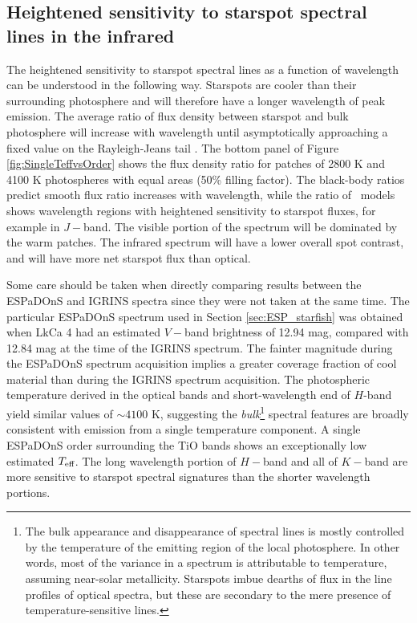 \documentclass[twocolumn]{emulateapj}%
\begin{document}
\subsection{Heightened sensitivity to starspot spectral lines in the infrared}\label{sec:whyNearIR}

The heightened sensitivity to starspot spectral lines as a function of wavelength can be understood in the following way.  Starspots are cooler than their surrounding photosphere and will therefore have a longer wavelength of peak emission.  The average ratio of flux density between starspot and bulk photosphere will increase with wavelength until asymptotically approaching a fixed value on the Rayleigh-Jeans tail \citep{wolk96}.  The bottom panel of Figure \ref{fig:SingleTeffvsOrder} shows the flux density ratio for patches of 2800 K and 4100 K photospheres with equal areas (50\% filling factor).  The black-body ratios predict smooth flux ratio increases with wavelength, while the ratio of \PHOENIX\ models shows wavelength regions with heightened sensitivity to starspot fluxes, for example in $J-$band.  The visible portion of the spectrum will be dominated by the warm patches.  The infrared spectrum will have a lower overall spot contrast, and will have more net starspot flux than optical.

Some care should be taken when directly comparing results between the ESPaDOnS and IGRINS spectra since they were not taken at the same time.  The particular ESPaDOnS spectrum used in Section \ref{sec:ESP_starfish} was obtained when LkCa 4 had an estimated $V-$band brightness of 12.94 mag, compared with 12.84 mag at the time of the IGRINS spectrum.  The fainter magnitude during the ESPaDOnS spectrum acquisition implies a greater coverage fraction of cool material than during the IGRINS spectrum acquisition.  
The photospheric temperature derived in the optical bands and short-wavelength end of $H$-band yield similar values of $\sim 4100$ K, suggesting the \emph{bulk}\footnote{The bulk appearance and disappearance of spectral lines is mostly controlled by the temperature of the emitting region of the local photosphere.  In other words, most of the variance in a spectrum is attributable to temperature, assuming near-solar metallicity. 
Starspots imbue dearths of flux in the line profiles of optical spectra, but these are secondary to the mere presence of temperature-sensitive lines.} spectral features are broadly consistent with emission from a single temperature component. A single ESPaDOnS order surrounding the TiO bands shows an exceptionally low estimated $T_\textrm{eff}$.  The long wavelength portion of $H-$band and all of $K-$band are more sensitive to starspot spectral signatures than the shorter wavelength portions.
\end{document}
